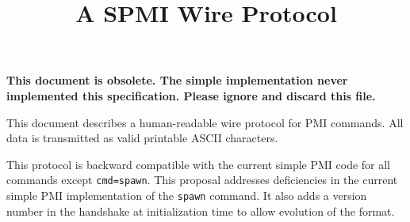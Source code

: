 \documentclass{article}
\title{A SPMI Wire Protocol}
\begin{document}
%
%
%
{\Large \textbf{This document is obsolete.  The simple implementation never
    implemented this specification.  Please ignore and discard this file.}}

This document describes a human-readable wire protocol for PMI
commands.  All data is transmitted as valid printable ASCII
characters.

This protocol is backward compatible with the current simple PMI code
for all commands except \texttt{cmd=spawn}.   This proposal addresses
deficiencies in the current simple PMI implementation of the
\texttt{spawn} command.  It also adds a version number in the
handshake at initialization time to allow evolution of the format.
\end{document}

